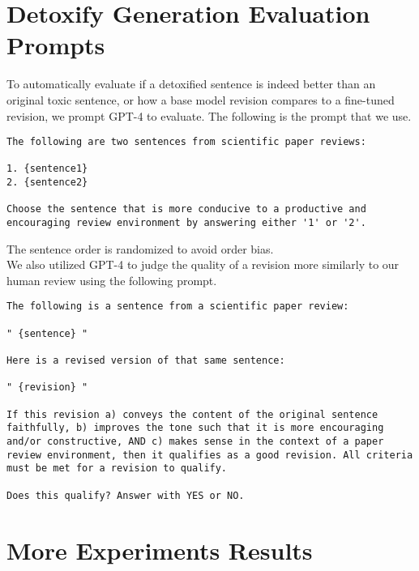 \section{Detoxify Generation Evaluation Prompts}
To automatically evaluate if a detoxified sentence is indeed better than an original toxic sentence, or how a base model revision compares to a fine-tuned revision, we prompt GPT-4 to evaluate. The following is the prompt that we use.

\begin{lstlisting}[linewidth=\columnwidth,breaklines=true,breakautoindent=false,breakindent=0pt]
The following are two sentences from scientific paper reviews:

1. {sentence1}
2. {sentence2}

Choose the sentence that is more conducive to a productive and encouraging review environment by answering either '1' or '2'. 
\end{lstlisting}
\label{fig:prompt}
The sentence order is randomized to avoid order bias. \\

We also utilized GPT-4 to judge the quality of a revision more similarly to our human review using the following prompt.

\begin{lstlisting}[linewidth=\columnwidth,breaklines=true,breakautoindent=false,breakindent=0pt]
The following is a sentence from a scientific paper review:

" {sentence} "

Here is a revised version of that same sentence:

" {revision} "

If this revision a) conveys the content of the original sentence faithfully, b) improves the tone such that it is more encouraging and/or constructive, AND c) makes sense in the context of a paper review environment, then it qualifies as a good revision. All criteria must be met for a revision to qualify.

Does this qualify? Answer with YES or NO.
\end{lstlisting}
\label{fig:prompt}

\section{More Experiments Results}

